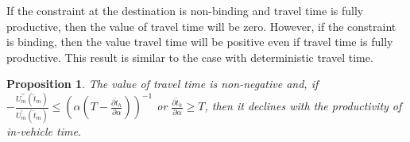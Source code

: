 \documentclass[12pt,a4paper,british]{article}
\newtheorem{prop}{Proposition}[section]
\begin{document}


If the constraint at the destination is non-binding and travel time is fully productive, then the value of travel time will be zero. However, if the constraint is binding, then the value travel time will be positive even if travel time is fully productive. This result is similar to the case with deterministic travel time.

\begin{prop}
The value of travel time is non-negative and, if $-\frac{U_{m} ^{\prime\prime} \left( \hat{t}_{m} \right)} {U_{m}^{\prime} \left(\hat{t}_{m}\right)} \leq \left(\alpha \left(T-\frac{\partial \hat{t}_h}{\partial \alpha} \right) \right)^{-1}$ or $\frac{\partial \hat{t}_h}{\partial \alpha} \geq T$, then it declines with the productivity of in-vehicle time. %
\end{prop}
\end{document}
